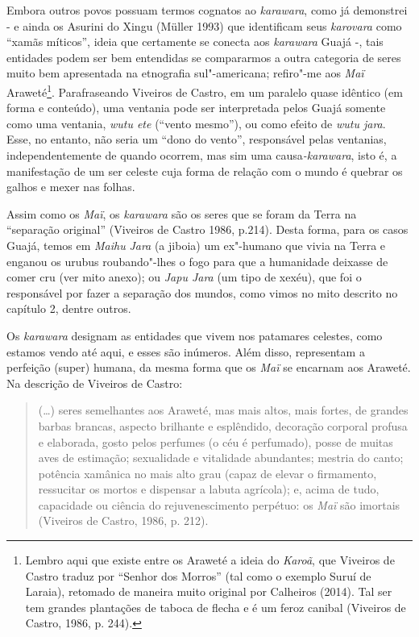 Embora outros povos possuam termos cognatos ao \emph{karawara}, como já
demonstrei - e ainda os Asurini do Xingu (Müller 1993) que identificam
seus \emph{karovara} como ``xamãs míticos'', ideia que certamente se
conecta aos \emph{karawara} Guajá -, tais entidades podem ser bem
entendidas se compararmos a outra categoria de seres muito bem
apresentada na etnografia sul"-americana; refiro"-me aos \emph{Maï}
Araweté\footnote{Lembro aqui que existe entre os Araweté a ideia do
  \emph{Karoã}, que Viveiros de Castro traduz por ``Senhor dos Morros''
  (tal como o exemplo Suruí de Laraia), retomado de maneira muito
  original por Calheiros (2014). Tal ser tem grandes plantações de
  taboca de flecha e é um feroz canibal (Viveiros de Castro, 1986, p.
  244).}. Parafraseando Viveiros de Castro, em um paralelo quase
idêntico (em forma e conteúdo), uma ventania pode ser interpretada pelos
Guajá somente como uma ventania, \emph{wutu ete} (``vento mesmo''), ou
como efeito de \emph{wutu jara}. Esse, no entanto, não seria um ``dono do
vento'', responsável pelas ventanias, independentemente de quando
ocorrem, mas sim uma causa\emph{-karawara}, isto é, a manifestação de um
ser celeste cuja forma de relação com o mundo é quebrar os galhos e
mexer nas folhas.

Assim como os \emph{Maï}, os \emph{karawara} são os seres que se foram
da Terra na ``separação original'' (Viveiros de Castro 1986, p.214).
Desta forma, para os casos Guajá, temos em \emph{Maihu} \emph{Jara} (a
jiboia) um ex"-humano que vivia na Terra e enganou os urubus
roubando"-lhes o fogo para que a humanidade deixasse de comer cru (ver
mito anexo); ou \emph{Japu Jara} (um tipo de xexéu), que foi o
responsável por fazer a separação dos mundos, como vimos no mito
descrito no capítulo 2, dentre outros.

Os \emph{karawara} designam as entidades que vivem nos patamares
celestes, como estamos vendo até aqui, e esses são inúmeros. Além disso,
representam a perfeição (super) humana, da mesma forma que os \emph{Maï}
se encarnam aos Araweté. Na descrição de Viveiros de Castro:

\begin{quote}
(\ldots{}) seres semelhantes aos Araweté, mas mais altos, mais fortes, de
grandes barbas brancas, aspecto brilhante e esplêndido, decoração
corporal profusa e elaborada, gosto pelos perfumes (o céu é perfumado),
posse de muitas aves de estimação; sexualidade e vitalidade abundantes;
mestria do canto; potência xamânica no mais alto grau (capaz de elevar o
firmamento, ressucitar os mortos e dispensar a labuta agrícola); e,
acima de tudo, capacidade ou ciência do rejuvenescimento perpétuo: os
\emph{Maï} são imortais (Viveiros de Castro, 1986, p. 212).
\end{quote}

